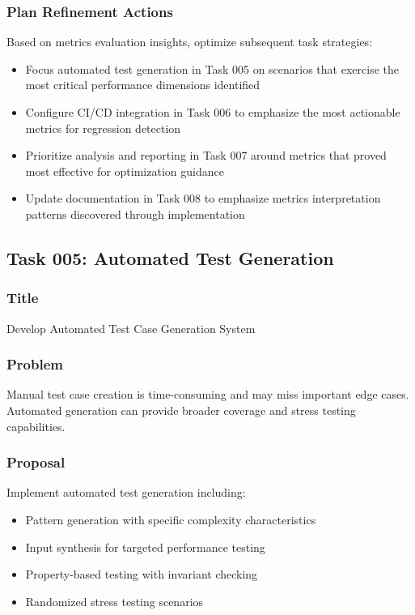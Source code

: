 \documentclass[11pt,a4paper]{article}
\begin{document}
\subsubsection{Plan Refinement Actions}
Based on metrics evaluation insights, optimize subsequent task strategies:
\begin{itemize}
    \item Focus automated test generation in Task 005 on scenarios that exercise the most critical performance dimensions identified
    \item Configure CI/CD integration in Task 006 to emphasize the most actionable metrics for regression detection
    \item Prioritize analysis and reporting in Task 007 around metrics that proved most effective for optimization guidance
    \item Update documentation in Task 008 to emphasize metrics interpretation patterns discovered through implementation
\end{itemize}


\subsection{Task 005: Automated Test Generation}

\subsubsection{Title}
Develop Automated Test Case Generation System

\subsubsection{Problem}
Manual test case creation is time-consuming and may miss important edge cases. Automated generation can provide broader coverage and stress testing capabilities.

\subsubsection{Proposal}
Implement automated test generation including:
\begin{itemize}
    \item Pattern generation with specific complexity characteristics
    \item Input synthesis for targeted performance testing
    \item Property-based testing with invariant checking
    \item Randomized stress testing scenarios
\end{itemize}
\end{document}
